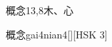 \begin{entry}{概念}{13,8}{⽊、⼼}
  \begin{phonetics}{概念}{gai4nian4}[][HSK 3]
  \end{phonetics}
\end{entry}
